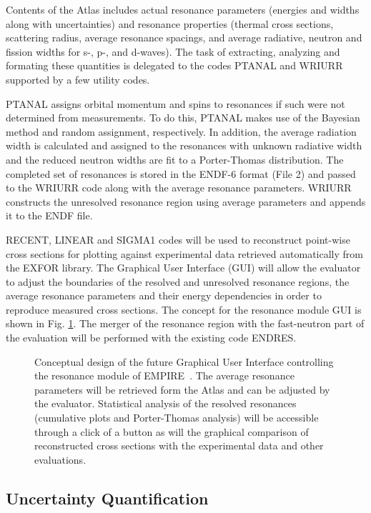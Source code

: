 Contents of the Atlas includes actual resonance parameters (energies and
widths along with uncertainties) and resonance properties (thermal cross
sections, scattering radius, average resonance spacings, and average
radiative, neutron and fission widths for s-, p-, and d-waves). The task of
extracting, analyzing and formating these quantities is delegated to the
codes PTANAL and WRIURR~\cite{Oh:00} supported by a few utility codes.

PTANAL assigns orbital momentum and spins to resonances if such were not
determined from measurements. To do this, PTANAL makes use of the Bayesian
method and random assignment, respectively. In addition, the average radiation
width is calculated and assigned to the resonances with unknown radiative
width and the reduced neutron widths are fit to a Porter-Thomas
distribution. The completed set of resonances is stored in the
ENDF-6 format (File 2) and passed to the WRIURR code along with the average
resonance parameters. WRIURR constructs the unresolved resonance region
using average parameters and appends it to the ENDF file.

RECENT, LINEAR and SIGMA1 codes will be used to reconstruct point-wise cross
sections for plotting against experimental data retrieved automatically from
the EXFOR library. The Graphical User Interface (GUI)
will allow the evaluator to adjust the boundaries of the
resolved and unresolved resonance regions, the average
resonance parameters and their energy dependencies in order to reproduce
measured cross sections. The concept for the resonance module GUI is shown
in Fig. \ref{fig:res-GUI}. The merger of the resonance region with the
fast-neutron part of the evaluation will be performed with the existing code
ENDRES.

\begin{figure}[htpb]
\caption{Conceptual design of the future Graphical User Interface controlling
the resonance module of EMPIRE~\protect\cite{Cho:07}. The average resonance
parameters will be retrieved form the Atlas and can be adjusted by the
evaluator. Statistical analysis of the resolved resonances (cumulative plots
and Porter-Thomas analysis) will be accessible through a click of
a button as will the graphical comparison of reconstructed cross
sections with the experimental data and other evaluations.}
\label{fig:res-GUI}
\end{figure}

\subsection{Uncertainty Quantification}

